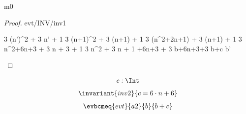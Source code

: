 \documentclass[12pt]{amsart}
\begin{document}
\begin{machine}{m0}
%
\begin{proof}{evt/INV/inv1}
	\begin{calculation}
		3 \cdot (n')^2 + 3 \cdot n' + 1
	\hint{=}{ \ref{a0} }
		3 \cdot (n+1)^2 + 3 \cdot (n+1) + 1
		3 \cdot (n^2+2\cdot n+1) + 3 \cdot (n+1) + 1
		3 \cdot n^2+6\cdot n+3 + 3 \cdot n + 3 + 1
		3 \cdot n^2 + 3 \cdot n + 1 +6\cdot n+3 + 3
	\hint{=}{ \ref{inv1} }
		b+6\cdot n+3+3
		b+c
		b'
	\end{calculation}
\end{proof}
%
\begin{align*}
\variable{	c : \Int}
\end{align*}
%
\begin{align*}
\invariant{inv2}
{	c = 6 \cdot n + 6	}
\end{align*} 
%
\begin{align*}
\evbcmeq{evt}{a2}
	{b}{b + c}
\end{align*}


\end{machine}
\end{document}
